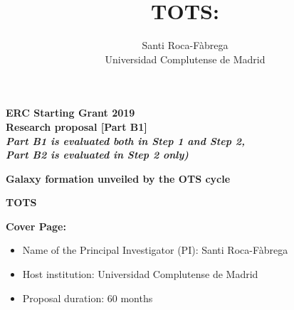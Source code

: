 \documentclass[oneside, a4paper, onecolumn, 11pt]{article}
\title{TOTS:\\ }
\author{Santi Roca-F\`abrega\\ Universidad Complutense de Madrid}
\begin{document}
\vfill

\begin{center}
\large{\textbf{ERC Starting Grant 2019\\
Research proposal [Part B1]\\
{\it Part B1 is evaluated both in Step 1 and Step 2,\\
Part B2 is evaluated in Step 2 only)}}
}
\vfill

\LARGE{\textbf{Galaxy formation unveiled by the OTS cycle}}

\vfill

\LARGE{\textbf{TOTS}}

\vfill

\end{center}
{\bf Cover Page:}
\begin{itemize}
\item Name of the Principal Investigator (PI): Santi Roca-F\`abrega
\item Host institution: Universidad Complutense de Madrid
\item Proposal duration: 60 months
\end{itemize}
	

\vfill
\end{document}
